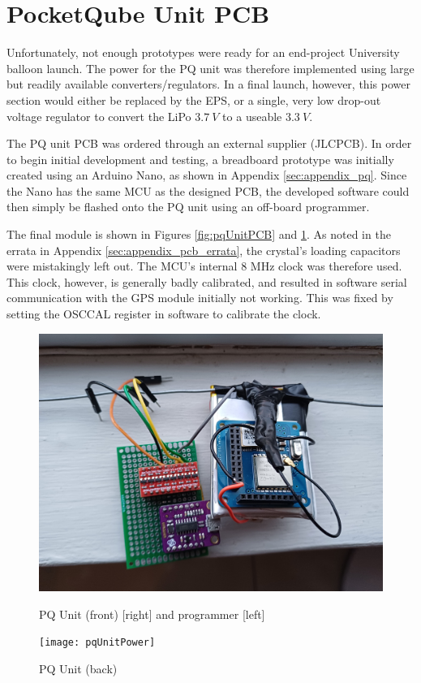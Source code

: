 \graphicspath{{./figures}}

\section{PocketQube Unit PCB}
Unfortunately, not enough prototypes were ready for an end-project University balloon launch. The power for the PQ unit was therefore implemented using large but readily available converters/regulators. In a final launch, however, this power section would either be replaced by the EPS, or a single, very low drop-out voltage regulator to convert the LiPo $\SI{3.7}{V}$ to a useable $\SI{3.3}{V}$.

The PQ unit PCB was ordered through an external supplier (JLCPCB). In order to begin initial development and testing, a breadboard prototype was initially created using an Arduino Nano, as shown in Appendix \ref{sec:appendix_pq}. Since the Nano has the same MCU as the designed PCB, the developed software could then simply be flashed onto the PQ unit using an off-board programmer.

The final module is shown in Figures \ref{fig:pqUnitPCB} and \ref{fig:pqUnitPower}. As noted in the errata in Appendix \ref{sec:appendix_pcb_errata}, the crystal's loading capacitors were mistakingly left out. The MCU's internal 8 MHz clock was therefore used. This clock, however, is generally badly calibrated, and resulted in software serial communication with the GPS module initially not working. This was fixed by setting the OSCCAL register in software to calibrate the clock.

\begin{figure}[!htb]
  \begin{minipage}{.49\textwidth}
    \centering
    \includegraphics[width=0.85\linewidth]{pqUnitPCB}
    \caption{PQ Unit (front) [right] and programmer [left]}
    \label{fig:pqUnitPCB}
  \end{minipage}
  \begin{minipage}{.49\textwidth}
    \centering
    \texttt{[image: pqUnitPower]}
    \caption{PQ Unit (back)}
    \label{fig:pqUnitPower}
  \end{minipage}
\end{figure}


